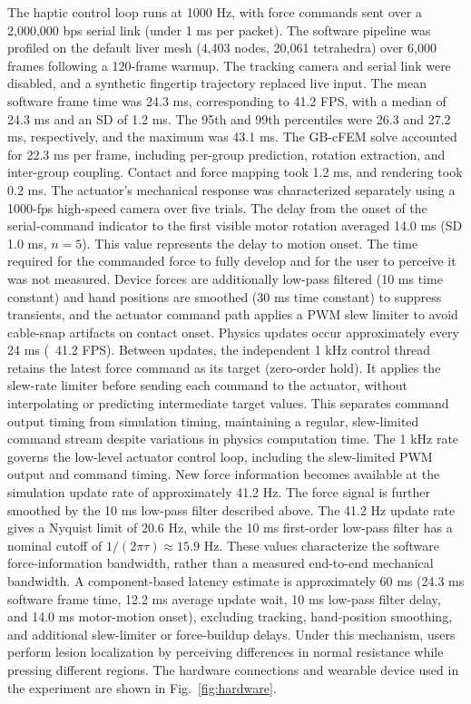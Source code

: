 \documentclass{ieeeaccess}
\begin{document}
The haptic control loop runs at 1000 Hz, with force commands sent over a 2{,}000{,}000 bps serial link (under 1 ms per packet). The software pipeline was profiled on the default liver mesh (4{,}403 nodes, 20{,}061 tetrahedra) over 6{,}000 frames following a 120-frame warmup. The tracking camera and serial link were disabled, and a synthetic fingertip trajectory replaced live input. The mean software frame time was 24.3 ms, corresponding to 41.2 FPS, with a median of 24.3 ms and an SD of 1.2 ms. The 95th and 99th percentiles were 26.3 and 27.2 ms, respectively, and the maximum was 43.1 ms. The GB-cFEM solve accounted for 22.3 ms per frame, including per-group prediction, rotation extraction, and inter-group coupling. Contact and force mapping took 1.2 ms, and rendering took 0.2 ms. The actuator's mechanical response was characterized separately using a 1000-fps high-speed camera over five trials. The delay from the onset of the serial-command indicator to the first visible motor rotation averaged 14.0 ms (SD 1.0 ms, $n=5$). This value represents the delay to motion onset. The time required for the commanded force to fully develop and for the user to perceive it was not measured. Device forces are additionally low-pass filtered (10 ms time constant) and hand positions are smoothed (30 ms time constant) to suppress transients, and the actuator command path applies a PWM slew limiter to avoid cable-snap artifacts on contact onset. Physics updates occur approximately every 24 ms (~41.2 FPS). Between updates, the independent 1 kHz control thread retains the latest force command as its target (zero-order hold). It applies the slew-rate limiter before sending each command to the actuator, without interpolating or predicting intermediate target values. This separates command output timing from simulation timing, maintaining a regular, slew-limited command stream despite variations in physics computation time. The 1 kHz rate governs the low-level actuator control loop, including the slew-limited PWM output and command timing. New force information becomes available at the simulation update rate of approximately 41.2 Hz. The force signal is further smoothed by the 10 ms low-pass filter described above. The 41.2 Hz update rate gives a Nyquist limit of 20.6 Hz, while the 10 ms first-order low-pass filter has a nominal cutoff of $1/(2\pi\tau)\approx15.9$ Hz. These values characterize the software force-information bandwidth, rather than a measured end-to-end mechanical bandwidth. A component-based latency estimate is approximately 60 ms (24.3 ms software frame time, 12.2 ms average update wait, 10 ms low-pass filter delay, and 14.0 ms motor-motion onset), excluding tracking, hand-position smoothing, and additional slew-limiter or force-buildup delays. Under this mechanism, users perform lesion localization by perceiving differences in normal resistance while pressing different regions. The hardware connections and wearable device used in the experiment are shown in Fig.~\ref{fig:hardware}.
\end{document}
